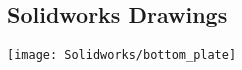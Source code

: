 \begin{flushleft}
\section{Solidworks Drawings}
\end{flushleft}
\label{app:SolidworksDrawings}
\begin{center}
\texttt{[image: Solidworks/bottom\_plate]} \newpage
\end{center}